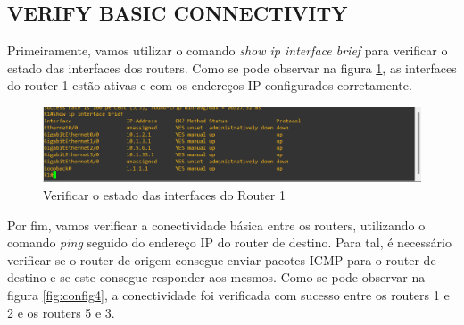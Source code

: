 \documentclass[11pt,english, openright, oneside]{book}
\begin{document}
\subsection{VERIFY BASIC CONNECTIVITY}
\vspace{0.2cm}

Primeiramente, vamos utilizar o comando \textit{show ip interface brief} para verificar o estado das interfaces dos routers. Como se pode observar na figura \ref{fig:config3}, as interfaces do router 1 estão ativas e com os endereços IP configurados corretamente.
\vspace{0.2cm}

\begin{figure}[H]
    \centering
    \includegraphics[width=1\textwidth]{imagens/Tarefa1/4.troubleshooting.png}
    \caption{Verificar o estado das interfaces do Router 1}
    \label{fig:config3}
\end{figure}
\vspace{0.2cm}

\newpage
Por fim, vamos verificar a conectividade básica entre os routers, utilizando o comando \textit{ping} seguido do endereço IP do router de destino. Para tal, é necessário verificar se o router de origem consegue enviar pacotes ICMP para o router de destino e se este consegue responder aos mesmos. Como se pode observar na figura \ref{fig:config4}, a conectividade foi verificada com sucesso entre os routers 1 e 2 e os routers 5 e 3.
\end{document}
